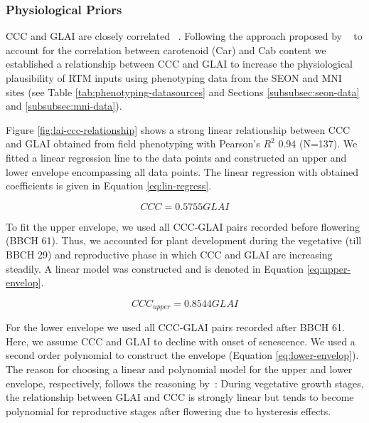 \subsubsection{Physiological Priors}
\label{subsubsec:physiological-constraints}

CCC and GLAI are closely correlated ~\citep{gitelson_remote_2005,gitelson_relationships_2014,gitelson_uncertainty_2022}. Following the approach proposed by ~\cite{wocher_rtm-based_2020} to account for the correlation between carotenoid (Car) and Cab content we established a relationship between CCC and GLAI to increase the physiological plausibility of RTM inputs using phenotyping data from the SEON and MNI sites (see Table \ref{tab:phenotyping-datasources} and Sections \ref{subsubsec:seon-data} and \ref{subsubsec:mni-data}).

Figure \ref{fig:lai-ccc-relationship} shows a strong linear relationship between CCC and GLAI obtained from field phenotyping with Pearson's $R^2$ 0.94 (N=137). We fitted a linear regression line to the data points and constructed an upper and lower envelope encompassing all data points. The linear regression with obtained coefficients is given in Equation \ref{eq:lin-regress}.

\begin{equation}
\label{eq:lin-regress}
    CCC = 0.5755 GLAI  %
\end{equation}

To fit the upper envelope, we used all CCC-GLAI pairs recorded before flowering (BBCH 61). Thus, we accounted for plant development during the vegetative (till BBCH 29) and reproductive phase in which CCC and GLAI are increasing steadily. A linear model was constructed and is denoted in Equation \ref{eq:upper-envelop}.

\begin{equation}
\label{eq:upper-envelop}
    CCC_{upper} = 0.8544 GLAI %
\end{equation}

For the lower envelope we used all CCC-GLAI pairs recorded after BBCH 61. Here, we assume CCC and GLAI to decline with onset of senescence. We used a second order polynomial to construct the envelope (Equation \ref{eq:lower-envelop}). The reason for choosing a linear and polynomial model for the upper and lower envelope, respectively, follows the reasoning by~\cite{gitelson_relationships_2014}: During vegetative growth stages, the relationship between GLAI and CCC is strongly linear but tends to become polynomial for reproductive stages after flowering due to hysteresis effects.

